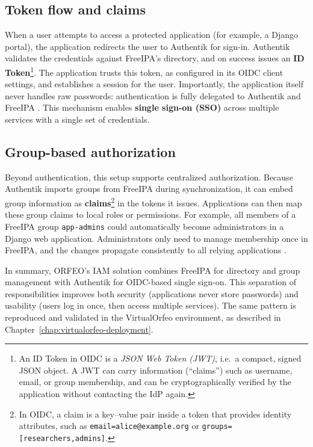 \subsection*{Token flow and claims}
When a user attempts to access a protected application (for example, a Django 
portal), the application redirects the user to Authentik for sign-in. 
Authentik validates the credentials against FreeIPA’s directory, and on success 
issues an \textbf{ID Token}\footnote{%
	An ID Token in OIDC is a \emph{JSON Web Token (JWT)}, i.e.\ a compact, signed 
	JSON object. A JWT can carry information (``claims'') such as username, 
	email, or group membership, and can be cryptographically verified by the 
	application without contacting the IdP again.}. The application trusts this 
token, as configured in its OIDC client settings, and establishes a session for 
the user. Importantly, the application itself never handles raw passwords: 
authentication is fully delegated to Authentik and FreeIPA 
\parencite{Authentik_Docs_OIDC,OpenIDConnectCore}. This mechanism enables 
\textbf{single sign-on (SSO)} across multiple services with a single set of 
credentials.

\subsection*{Group-based authorization}
Beyond authentication, this setup supports centralized authorization. Because 
Authentik imports groups from FreeIPA during synchronization, it can embed group 
information as \textbf{claims}\footnote{%
	In OIDC, a claim is a key--value pair inside a token that provides identity 
	attributes, such as \texttt{email=alice@example.org} or 
	\texttt{groups=[researchers,admins]}.} in the tokens it issues. Applications 
can then map these group claims to local roles or permissions. For example, all 
members of a FreeIPA group \texttt{app-admins} could automatically become 
administrators in a Django web application. Administrators only need to manage 
membership once in FreeIPA, and the changes propagate consistently to all 
relying applications \parencite{Authentik_Docs_Claims,FreeIPA_Docs}. 

\medskip

In summary, ORFEO’s IAM solution combines FreeIPA for directory and group 
management with Authentik for OIDC-based single sign-on. This separation of 
responsibilities improves both security (applications never store passwords) and 
usability (users log in once, then access multiple services). The same pattern 
is reproduced and validated in the VirtualOrfeo environment, as described in 
Chapter~\ref{chap:virtualorfeo-deployment}.
